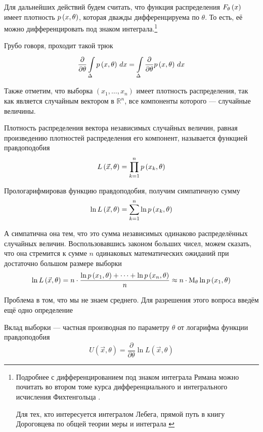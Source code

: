 \begin{remark}\label{remark:doubleDiff}
  Для дальнейших действий будем считать, что функция распределения
  $\cdfof{\theta}{x}$ имеет плотность $\pdf{x,\theta}$,
  которая дважды дифференцируема по $\theta$.
  То есть, её можно дифференцировать под знаком интеграла.\footnote{Подробнее
  с дифференцированием под знаком интеграла Римана можно почитать во втором
  томе курса дифференциального и интегрального исчисления Фихтенгольца
  \cite[с.~712]{Fichtenholz2}.

  Для тех, кто интересуется интегралом Лебега, прямой путь в книгу
  Дороговцева по общей теории меры и интеграла \cite[с.~102]{DorogovtsevIT}}

  Грубо говоря, проходит такой трюк
  $$\frac{\partial}{\partial \theta}\integrall{\Delta}{dx}{\pdf{x, \theta}}
    = \integrall{\Delta}{dx}{
      \frac{\partial}{\partial \theta}\pdf{x, \theta}}$$
\end{remark}

Также отметим, что выборка $\left( x_1, \dots, x_n \right)$
имеет плотность распределения,
так как является случайным вектором в $\mathbb{R}^n$,
все компоненты которого --- случайные величины.

\begin{definition}
  \label{def:likehoodFunction}
  Плотность распределения вектора независимых случайных величин,
  равная произведению плотностей распределения его компонент,
  называется функцией правдоподобия
  $$L\left( \vec{x},\theta \right)=\prod_{k=1}^n\pdf{x_k,\theta}$$
\end{definition}

Прологарифмировав функцию правдоподобия, получим симпатичную сумму
$$\ln{L\left( \vec{x},\theta \right)}=\sum_{k=1}^n\ln{\pdf{x_k,\theta}}$$

А симпатична она тем,
что это сумма независимых одинаково распределённых случайных величин.
Воспользовавшись законом больших чисел, можем сказать,
что она стремится к сумме $n$ одинаковых математических ожиданий
при достаточно большом размере выборки
$$\ln{L\left( \vec{x},\theta \right)}
  = n\cdot\frac{\ln{\pdf{x_1,\theta}}+\dots+\ln{\pdf{x_n,\theta}}}{n}
  \approx n\cdot\meanof{\theta}{\ln{\pdf{x_1,\theta}}}$$

Проблема в том, что мы не знаем среднего.
Для разрешения этого вопроса введём ещё одно определение

\begin{definition}\label{def:defU}
  Вклад выборки --- частная производная по параметру $\theta$
  от логарифма функции правдоподобия
  $$U\left( \vec{x},\theta \right)
      =\frac{\partial}{\partial\theta}\ln{L\left(\vec{x},\theta\right)}$$
\end{definition}

